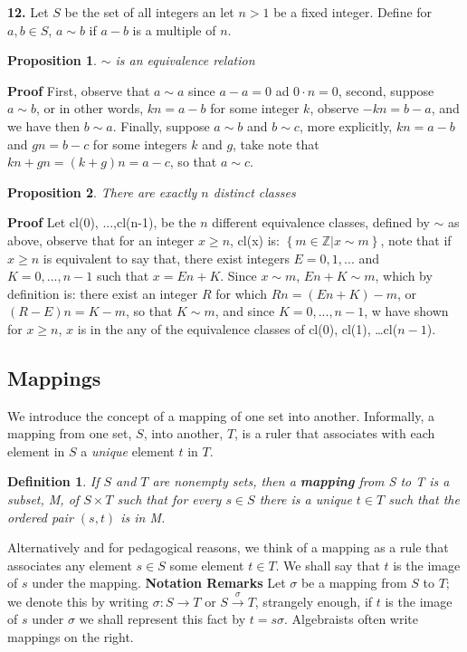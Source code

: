 \documentclass[11pt,a4paper]{article}
\newtheorem{define}{Definition}
\newtheorem{claim}{Proposition}
\begin{document}
\textbf{12.} Let $S$ be the set of all integers an let $ n >1$ be a fixed integer. Define for $a,b \in S$, $a \sim b$ if $ a - b$ is a multiple of $n$. 
\begin{claim}
	$\sim$ is an equivalence relation
\end{claim}
\textbf{Proof}
First, observe that $ a \sim a$ since $ a - a = 0$ ad $0 \cdot n = 0$, second, suppose $ a \sim b$, or in other words, $ kn = a -b$ for some integer $k$, observe $ -kn = b - a$, and we have then $ b \sim a$. Finally, suppose $ a \sim b$ and $b \sim c$, more explicitly, $kn = a -b$ and $gn = b -c$ for some integers $k$ and $g$, take note that $kn + gn = (k +g)n = a -c$, so that $ a \sim c$. \par 
\begin{claim}
	There are exactly $n$ distinct classes
\end{claim}
\textbf{Proof}
Let cl(0), ...,cl(n-1), be the $n$ different equivalence classes, defined by $ \sim $ as above, observe that for an integer $ x \geq n $, cl(x) is: $ \left\lbrace m \in \mathbb{Z} \vert x \sim m \right\rbrace $, note that  if $ x \geq n $ is equivalent to say that, there exist integers  $ E = {0,1,...} $ and $K = {0,...,n-1} $ such that $ x = En + K $. Since $ x \sim m $, $ En + K \sim m$, which by definition is: there exist an integer $R$ for which $ Rn= (En + K) - m$, or $ (R - E)n = K - m $, so that $ K \sim m$, and since $K = {0,...,n-1}$, w have shown for $ x \geq n $, $x$ is in the any of the equivalence classes of cl(0), cl(1), \ldots cl($n-1$).
\subsection{Mappings}
We introduce the concept of a mapping of one set into another. Informally, a mapping from one set, $S$, into another, $T$, is a ruler that associates with each element in $S$ a \emph{unique} element $t$ in $T$.
\begin{define}
	If $S$ and $T$ are nonempty sets, then a \textbf{mapping} from S to T is a subset, M, of $ S \times T$ such that for every $ s \in S$ there is a unique $t \in T$ such that the ordered pair $ (s,t)$ is in M.	
\end{define}
Alternatively and for pedagogical reasons, we think of a mapping as a rule that associates any element $s \in S$ some element $ t \in T$. We shall say that $t$ is the image of $s$ under the mapping.
\textbf{Notation Remarks} Let $ \sigma $ be a mapping from $S$ to $T$; we denote this by writing $\sigma : S \rightarrow T$ or $ S \xrightarrow{\sigma} T$, strangely enough, if $t$ is the image of $s$ under $\sigma$ we shall represent this fact by $ t = s\sigma $. Algebraists often write mappings on the right. 
\end{document}
